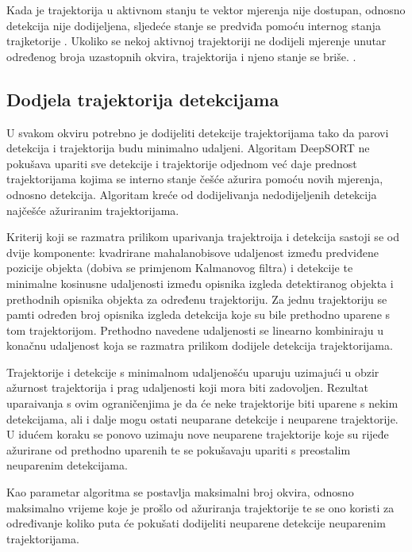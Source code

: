 \documentclass[times, utf8, seminar, numeric]{fer}
\begin{document}
Kada je trajektorija u aktivnom stanju te vektor mjerenja nije dostupan, odnosno detekcija nije dodijeljena, sljedeće stanje se predviđa pomoću internog stanja trajketorije \cite{sort}.
Ukoliko se nekoj aktivnoj trajektoriji ne dodijeli mjerenje unutar određenog broja uzastopnih okvira, trajektorija i njeno stanje se briše. \cite{deepsort}.


\subsection{Dodjela trajektorija detekcijama}

U svakom okviru potrebno je dodijeliti detekcije trajektorijama tako da parovi detekcija i trajektorija budu minimalno udaljeni.
Algoritam DeepSORT ne pokušava upariti sve detekcije i trajektorije odjednom već daje prednost trajektorijama kojima se interno stanje češće ažurira pomoću novih mjerenja, odnosno detekcija. 
Algoritam kreće od dodijelivanja nedodijeljenih detekcija najčešće ažuriranim trajektorijama. 

Kriterij koji se razmatra prilikom uparivanja trajektroija i detekcija sastoji se od dvije komponente: kvadrirane mahalanobisove udaljenost između predviđene pozicije objekta (dobiva se primjenom Kalmanovog filtra) i detekcije te minimalne kosinusne udaljenosti između opisnika izgleda detektiranog objekta i prethodnih opisnika objekta za određenu trajektoriju. Za jednu trajektoriju se pamti određen broj opisnika izgleda detekcija koje su bile prethodno uparene s tom trajektorijom. Prethodno navedene udaljenosti se linearno kombiniraju u konačnu udaljenost koja se razmatra prilikom dodijele detekcija trajektorijama.

Trajektorije i detekcije s minimalnom udaljenošću uparuju uzimajući u obzir ažurnost trajektorija i prag udaljenosti koji mora biti zadovoljen. Rezultat uparaivanja s ovim ograničenjima je da će neke trajektorije biti uparene s nekim detekcijama, ali i dalje mogu ostati neuparane detekcije i neuparene trajektorije. U idućem koraku se ponovo uzimaju nove neuparene trajektorije koje su rijeđe ažurirane od prethodno uparenih te se pokušavaju upariti s preostalim neuparenim detekcijama. 

Kao parametar algoritma se postavlja maksimalni broj okvira, odnosno maksimalno vrijeme koje je prošlo od ažuriranja trajektorije te se ono koristi za određivanje koliko puta će pokušati dodijeliti neuparene detekcije neuparenim trajektorijama. 
\end{document}
